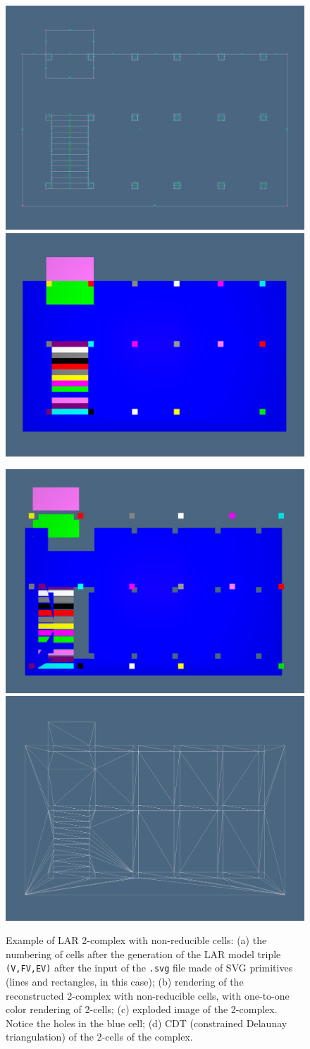 \documentclass[11pt,oneside]{article}    %
\begin{document}
\begin{figure}[htbp] %
   \centering
   \includegraphics[width=0.495\linewidth]{images/floor1} 
   \includegraphics[width=0.495\linewidth]{images/floor2} 

   \includegraphics[width=0.495\linewidth]{images/floor3} 
   \includegraphics[width=0.495\linewidth]{images/floor4} 
   \caption{Example of LAR 2-complex with non-reducible cells: (a)  the numbering of cells after the generation of the LAR model triple \texttt{(V,FV,EV)} after the input of the \texttt{.svg} file made of SVG primitives (lines and rectangles, in this case); (b)  rendering of the reconstructed 2-complex with non-reducible cells, with one-to-one color rendering of 2-cells; (c)  exploded image of the 2-complex. Notice the holes in the blue cell; (d)  CDT (constrained Delaunay triangulation) of the 2-cells of the complex.}
   \label{fig:floor}
\end{figure}
\end{document}
